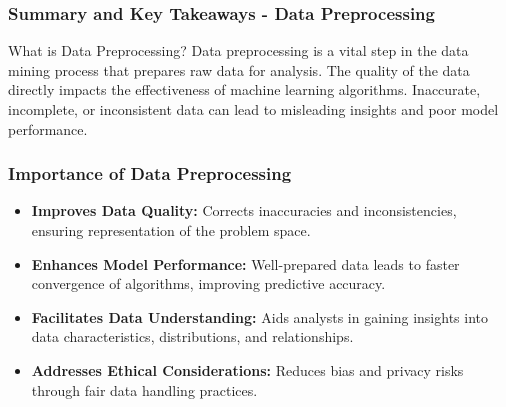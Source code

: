 \documentclass[aspectratio=169]{beamer}
\begin{document}
\begin{frame}[fragile]
    \frametitle{Summary and Key Takeaways - Data Preprocessing}
    
    \begin{block}{What is Data Preprocessing?}
        Data preprocessing is a vital step in the data mining process that prepares raw data for analysis. The quality of the data directly impacts the effectiveness of machine learning algorithms. Inaccurate, incomplete, or inconsistent data can lead to misleading insights and poor model performance.
    \end{block}
\end{frame}

\begin{frame}[fragile]
    \frametitle{Importance of Data Preprocessing}
    
    \begin{itemize}
        \item \textbf{Improves Data Quality:} Corrects inaccuracies and inconsistencies, ensuring representation of the problem space.
        \item \textbf{Enhances Model Performance:} Well-prepared data leads to faster convergence of algorithms, improving predictive accuracy.
        \item \textbf{Facilitates Data Understanding:} Aids analysts in gaining insights into data characteristics, distributions, and relationships.
        \item \textbf{Addresses Ethical Considerations:} Reduces bias and privacy risks through fair data handling practices.
    \end{itemize}
\end{frame}
\end{document}
